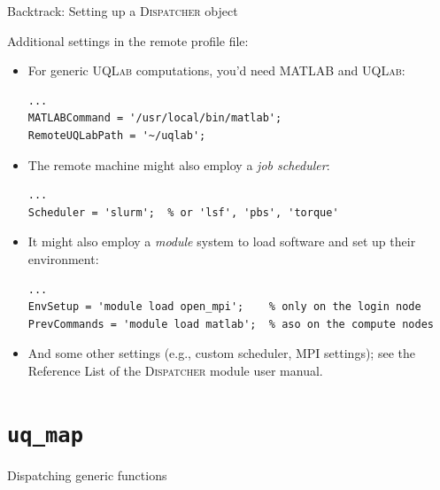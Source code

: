 \documentclass[]{rsuqbeamernew}
\begin{document}
\begin{frame}[fragile]{Backtrack: Setting up a \textsc{Dispatcher} object}

Additional settings in the remote profile file:
\begin{itemize}
  \item For generic \textsc{UQLab} computations, you'd need \textsc{MATLAB} and \textsc{UQLab}:
\begin{lstlisting}[basicstyle=\scriptsize,numbers=none]
...
MATLABCommand = '/usr/local/bin/matlab';
RemoteUQLabPath = '~/uqlab';
\end{lstlisting}

  \item The remote machine might also employ a \emph{job scheduler}:
\begin{lstlisting}[basicstyle=\scriptsize,numbers=none]
...
Scheduler = 'slurm';  % or 'lsf', 'pbs', 'torque'
\end{lstlisting}
   
  \item It might also employ a \emph{module} system to load software and set up their environment:
\begin{lstlisting}[basicstyle=\scriptsize,numbers=none]
...
EnvSetup = 'module load open_mpi';    % only on the login node
PrevCommands = 'module load matlab';  % aso on the compute nodes
\end{lstlisting}

  \item And some other settings (e.g., custom scheduler, MPI settings);
  see the Reference List of the \textsc{Dispatcher} module user manual.
\end{itemize}

\end{frame}

\section{\texttt{uq\_map}}
\begin{frame}[fragile]{Dispatching generic functions}

\textbf{}

\end{frame}
\end{document}
